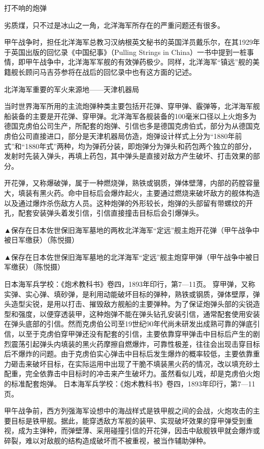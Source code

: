 \documentclass[12pt,UTF8]{ctexbook}
\begin{document}
打不响的炮弹

劣质煤，只不过是冰山之一角，北洋海军所存在的严重问题还有很多。

甲午战争时，担任北洋海军总教习汉纳根英文秘书的英国洋员戴乐尔，在其1929年于英国出版的回忆录《中国纪事》（Pulling Strings in China）一书中提到一桩事情，即甲午战争中，北洋海军军舰的有效弹药极少。同样，北洋海军“镇远”舰的美籍舰长顾问马吉芬参将在战后的回忆录中也有这方面的记述。


北洋海军重要的军火来源地——天津机器局

当时世界海军所用的主流炮弹种类主要包括开花弹、穿甲弹、霰弹等，北洋海军舰船装备的主要是开花弹、穿甲弹。北洋海军各舰装备的100毫米口径以上火炮多为德国克虏伯公司生产，所配套的炮弹、引信也多是德国克虏伯式，部分为从德国克虏伯公司直接进口，部分是天津机器局仿造，炮弹设计样式上分为“1880年前式”和“1880年式”两种，均为弹药分装，即炮弹分为弹头和药包两个独立的部分，发射时先装入弹头，再填上药包，其中弹头是直接对敌方产生破坏、打击效果的部分。

开花弹，又称爆破弹，属于一种燃烧弹，熟铁或钢质，弹体壁薄，内部的药膛容量大，填装有黑火药。命中目标后会爆炸起火，主要通过燃烧来破坏敌方的舰体构造以及通过爆炸杀伤敌方人员。这种炮弹的外形较长，炮弹的头部留有带螺纹的开孔，配套安装弹头着发引信，引信直接撞击目标后会引爆弹头。


▲保存在日本佐世保旧海军墓地的两枚北洋海军“定远”舰主炮开花弹（甲午战争中被日军缴获）（陈悦摄）


▲保存在日本佐世保旧海军墓地的北洋海军“定远”舰主炮穿甲弹（甲午战争中被日军缴获）（陈悦摄）

日本海军兵学校：《炮术教科书》卷四，1893年印行，第7—11页。
穿甲弹，又称实弹、实心弹、填砂弹，是利用动能破坏目标的弹种，熟铁或钢质，弹体壁厚，弹头造型尖锐，是用以打击、摧毁敌方舰船的主要弹种。为了保证炮弹头部的尖锐造型和强度，以便穿透装甲，这种炮弹不能在弹头钻孔安装引信，通常配套使用安装在弹头底部的引信。然而克虏伯公司至19世纪90年代尚未研发出成熟可靠的弹底引信，以至于克虏伯穿甲弹还没有配套的引信，主要依靠穿甲弹击中目标后产生的剧烈震荡引起弹头内填装的黑火药摩擦自燃爆炸，可靠性极差，往往会出现击穿目标后不爆炸的问题。由于克虏伯实心弹击中目标后发生爆炸的概率较低，主要依靠重力砸击来破坏目标，在实际运用中出现了干脆不填装黑火药的情况，改以填充砂土配重，完全依靠击中目标时的冲击来产生破坏力。虽然看似儿戏，却是克虏伯火炮的标准配套炮弹。 日本海军兵学校：《炮术教科书》卷四，1893年印行，第7—11页。

甲午战争前，西方列强海军设想中的海战样式是铁甲舰之间的会战，火炮攻击的主要目标是铁甲舰。据此，能穿透敌方军舰的装甲、实现破坏效果的穿甲弹受到重视，成为主弹种，而弹壁薄、采用碰撞引信的开花弹，因击中敌舰铁甲就会爆炸或碎裂，难以对敌舰的结构造成破坏而不被重视，被当作辅助弹种。
\end{document}
